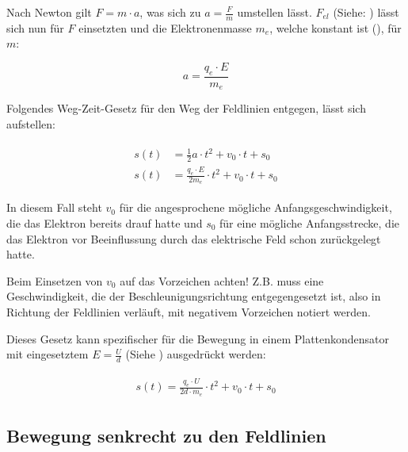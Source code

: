 
Nach Newton gilt $F = m \cdot a$, was sich zu $a = \frac{F}{m}$ umstellen lässt. $F_{el}$ (Siehe: ) lässt sich nun für $F$ einsetzten und die Elektronenmasse $m_e$, welche konstant ist (), für $m$:

\begin{equation}
	a = \frac{q_e \cdot E}{m_e}
\end{equation}


Folgendes Weg-Zeit-Gesetz für den Weg der Feldlinien entgegen, lässt sich aufstellen:

\begin{align} \label{eq:s(t)Allgemein}
\begin{split}
	s(t) &= \frac{1}{2} a \cdot t^2 + v_0 \cdot t + s_0 \\
	s(t) &= \frac{q_e \cdot E}{2m_e} \cdot t^2 + v_0 \cdot t + s_0
\end{split}
\end{align}

\noindent In diesem Fall steht $v_0$ für die angesprochene mögliche Anfangsgeschwindigkeit, die das Elektron bereits \glqq drauf hatte\grqq{} und $s_0$ für eine mögliche Anfangsstrecke, die das Elektron vor Beeinflussung durch das elektrische Feld schon zurückgelegt hatte.

\begin{Wichtig}
Beim Einsetzen von $v_0$ auf das Vorzeichen achten! Z.B. muss eine Geschwindigkeit, die der Beschleunigungsrichtung  entgegengesetzt ist, also in Richtung der Feldlinien verläuft, mit negativem Vorzeichen notiert werden.
\end{Wichtig}

Dieses Gesetz kann spezifischer für die Bewegung in einem Plattenkondensator mit eingesetztem $E=\frac{U}{d}$ (Siehe ) ausgedrückt werden:

\begin{align} \label{eq:s(t)imKondensator}
\begin{split}
	s(t) = \frac{q_e \cdot U}{2d \cdot m_e} \cdot t^2 + v_0 \cdot t + s_0
\end{split}
\end{align}


\subsection{Bewegung senkrecht zu den Feldlinien} \label{subsec:BewegungsgesetzSenkrecht}

